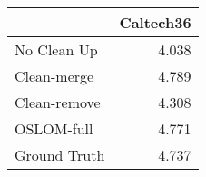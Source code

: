 \begin{tabular}{lr}
\toprule
{} & Caltech36 \\
\midrule
No Clean Up  &     4.038 \\
Clean-merge  &     4.789 \\
Clean-remove &     4.308 \\
OSLOM-full   &     4.771 \\
Ground Truth &     4.737 \\
\bottomrule
\end{tabular}
